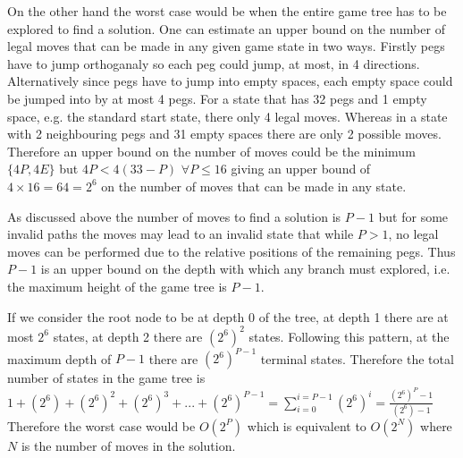 \documentclass[12pt,a4paper]{report}
\begin{document}
On the other hand the worst case would be when the entire game tree has to be explored to find a solution. One can estimate an upper bound on the number of legal moves that can be made in any given game state in two ways. Firstly pegs have to jump orthoganaly so each peg could jump, at most, in 4 directions. Alternatively since pegs have to jump into empty spaces, each empty space could be jumped into by at most 4 pegs. For a state that has 32 pegs and 1 empty space, e.g. the standard start state, there only 4 legal moves. Whereas in a state with 2 neighbouring pegs and 31 empty spaces there are only 2 possible moves. Therefore an upper bound on the number of moves could be the minimum$\{4P,4E\}$ but $4P<4(33-P)$ $\forall P\leq16$ giving an upper bound of $4\times16=64=2^6$ on the number of moves that can be made in any state.

As discussed above the number of moves to find a solution is $P-1$ but for some invalid paths the moves may lead to an invalid state that while $P>1$, no legal moves can be performed due to the relative positions of the remaining pegs. Thus $P-1$ is an upper bound on the depth with which any branch must explored, i.e. the maximum height of the game tree is $P-1$.

If we consider the root node to be at depth $0$ of the tree, at depth 1 there are at most $2^6$ states, at depth 2 there are $(2^6)^2$ states. Following this pattern, at the maximum depth of $P-1$ there are $(2^6)^{P-1}$ terminal states. Therefore the total number of states in the game tree is $1+(2^6)+(2^6)^2+(2^6)^3+...+(2^6)^{P-1}=\sum_{i=0}^{i=P-1} (2^6)^i=\frac{(2^6)^P-1}{(2^6)-1}$
Therefore the worst case would be $O(2^{P})$ which is equivalent to $O(2^{N})$ where $N$ is the number of moves in the solution.
\end{document}

